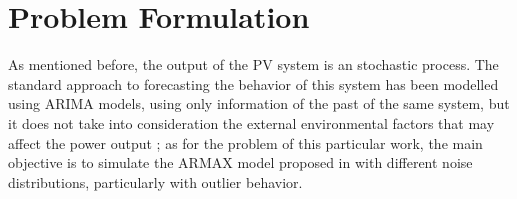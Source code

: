 \section{Problem Formulation}\label{sec:probForm}
As mentioned before, the output of the PV system is an stochastic process. The standard approach to forecasting the behavior of this system has been modelled using ARIMA models, using only information of the past of the same system, but it does not take into consideration the external environmental factors that may affect the power output \cite{li2014armax}; as for the problem of this particular work, the main objective is to simulate the ARMAX model proposed in \cite{li2014armax} with different noise distributions, particularly with outlier behavior.
